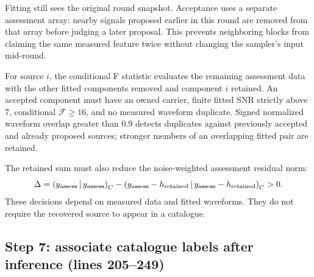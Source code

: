 \documentclass[11pt,a4paper]{article}
\newcommand{\ip}[2]{\left(#1\,\middle|\,#2\right)}
\begin{document}
Fitting still sees the original round snapshot. Acceptance uses a separate
assessment array: nearby signals proposed earlier in this round are removed
from that array before judging a later proposal. This prevents neighboring
blocks from claiming the same measured feature twice without changing the
sampler's input mid-round.

For source \(i\), the conditional F statistic evaluates the remaining assessment
data with the other fitted components removed and component \(i\) retained.
An accepted component must have an owned carrier, finite fitted SNR strictly
above 7, conditional \(\mathcal F\geq16\), and no measured waveform duplicate.
Signed normalized waveform overlap greater than 0.9 detects duplicates against
previously accepted and already proposed sources; stronger members of an
overlapping fitted pair are retained.

The retained sum must also reduce the noise-weighted assessment residual norm:
\[
\Delta=\ip{y_{\rm assess}}{y_{\rm assess}}_C
       -\ip{y_{\rm assess}-h_{\rm retained}}
            {y_{\rm assess}-h_{\rm retained}}_C > 0.
\]
These decisions depend on measured data and fitted waveforms. They do not
require the recovered source to appear in a catalogue.

\subsection{Step 7: associate catalogue labels after inference (lines 205--249)}
\end{document}

